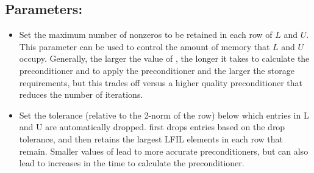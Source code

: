 
\subsection*{Parameters:}

\begin{itemize}

\item
{}
Set the maximum number of nonzeros to be retained in each row of $L$ and $U$.
This parameter can be used to control the amount of memory that $L$ and $U$
occupy. Generally, the larger the value of , the longer it takes to
calculate the preconditioner and to apply the preconditioner and the larger
the storage requirements, but this trades
off versus a higher quality preconditioner that reduces the number of
iterations.

\item
{}
Set the tolerance (relative to the 2-norm of the row) below which entries in L
and U are automatically dropped. \pilut{} first drops entries based on the drop
tolerance, and then retains the largest LFIL elements in each row that remain.
Smaller values of  lead to more accurate preconditioners, but can
also lead to increases in the time to calculate the preconditioner.

\end{itemize}


